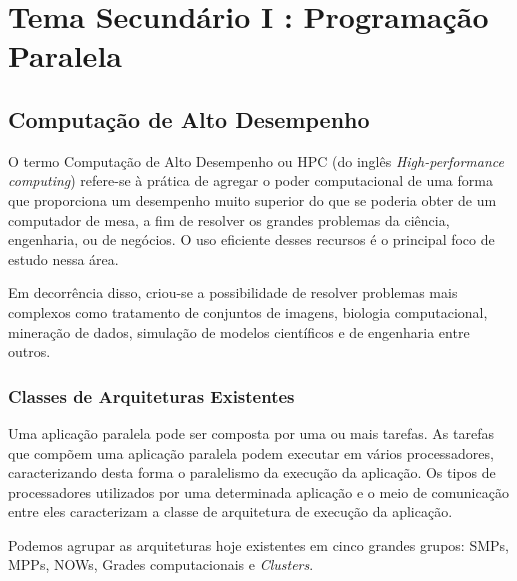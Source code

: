 \chapter{Tema Secundário I : Programação Paralela}\label{tema3}


\section{Computação de Alto Desempenho}\label{Computação de alto desempenho}

O termo Computação de Alto Desempenho ou HPC (do inglês \textit{High-performance computing}) refere-se à prática de agregar o poder computacional de uma forma que proporciona um desempenho muito superior do que se poderia obter de um computador de mesa, a fim de resolver os grandes problemas da ciência, engenharia, ou de negócios. O uso eficiente desses recursos é o principal foco de estudo nessa área.

Em decorrência disso, criou-se a possibilidade de resolver problemas mais complexos como tratamento de conjuntos de imagens, biologia computacional, mineração de dados, simulação de modelos científicos e de engenharia entre outros.


\subsection{Classes de Arquiteturas Existentes}

Uma aplicação paralela pode ser composta por uma ou mais tarefas. As tarefas que compõem uma aplicação paralela podem executar em vários processadores, caracterizando desta forma o paralelismo da execução da aplicação. Os tipos de processadores utilizados por uma determinada aplicação e o meio de comunicação entre eles caracterizam a classe de arquitetura de execução da aplicação.

Podemos agrupar as arquiteturas hoje existentes em cinco grandes grupos: SMPs, MPPs, NOWs, Grades computacionais e \textit{Clusters}.

